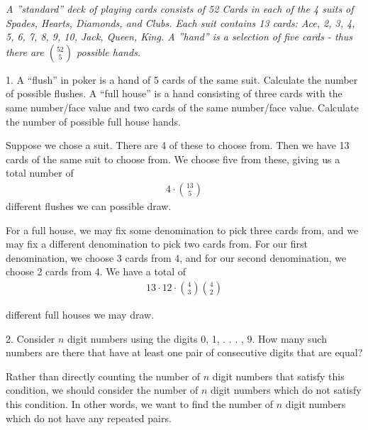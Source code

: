 \documentclass{article}
\begin{document}
\emph{A ”standard” deck of playing cards consists of 52 Cards in each of the 4 suits of Spades,
Hearts, Diamonds, and Clubs. Each suit contains 13 cards: Ace, 2, 3, 4, 5, 6, 7, 8, 9, 10,
Jack, Queen, King. A ”hand” is a selection of five cards - thus there are $\binom{52}{5}$ possible hands.}

\vspace{5mm}

1. A “flush” in poker is a hand of 5 cards of the same suit. Calculate the number of possible
flushes. A “full house” is a hand consisting of three cards with the same number/face
value and two cards of the same number/face value. Calculate the number of possible
full house hands.
\vspace{5mm}

Suppose we chose a suit. There are 4 of these to choose from.
Then we have 13 cards of the same suit to choose from. We choose five from these, giving us
a total number of 
\begin{align*}
    4 \cdot \binom{13}{5}
\end{align*}
different flushes we can possible draw.

\vspace{5mm}

For a full house, we may fix some denomination to pick three cards from, and we may fix a different
denomination to pick two cards from. For our first denomination, we choose 3 cards from 4, and for our second 
denomination, we choose 2 cards from 4. We have a total of
\begin{align*}
13 \cdot 12 \cdot \binom{4}{3} \binom{4}{2}
\end{align*}

different full houses we may draw.

\vspace{5mm}

2. Consider $n$ digit numbers using the digits 0, 1, . . . , 9. How many such numbers are there
that have at least one pair of consecutive digits that are equal?

\vspace{5mm}

Rather than directly counting the number of $n$ digit numbers that satisfy this condition, we should
consider the number of $n$ digit numbers which do not satisfy this condition. In other words,
we want to find the number of $n$ digit numbers which do not have any repeated pairs.

\vspace{5mm}
\end{document}
